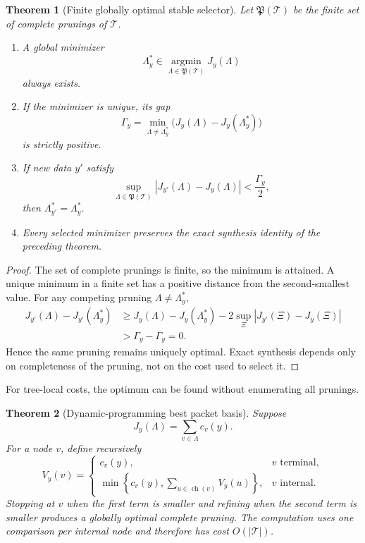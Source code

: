 \documentclass[11pt]{article}
\newtheorem{theorem}{Theorem}[section]
\theoremstyle{definition}
\theoremstyle{remark}
\begin{document}
\begin{theorem}[Finite globally optimal stable selector]
Let $\mathfrak P(\mathcal T)$ be the finite set of complete prunings of $\mathcal T$.

\begin{enumerate}[label=(\roman*)]
\item A global minimizer
\[
\Lambda_y^*\in\operatorname*{argmin}_{\Lambda\in\mathfrak P(\mathcal T)}J_y(\Lambda)
\]
always exists.
\item If the minimizer is unique, its gap
\[
\Gamma_y
=
\min_{\Lambda\ne\Lambda_y^*}
\bigl(J_y(\Lambda)-J_y(\Lambda_y^*)\bigr)
\]
is strictly positive.
\item If new data $y'$ satisfy
\[
\sup_{\Lambda\in\mathfrak P(\mathcal T)}
|J_{y'}(\Lambda)-J_y(\Lambda)|
<\frac{\Gamma_y}{2},
\]
then $\Lambda_{y'}^*=\Lambda_y^*$.
\item Every selected minimizer preserves the exact synthesis identity of the preceding theorem.
\end{enumerate}
\end{theorem}

\begin{proof}
The set of complete prunings is finite, so the minimum is attained.  A unique minimum in a finite set has a positive distance from the second-smallest value.  For any competing pruning $\Lambda\ne\Lambda_y^*$,
\[
\begin{aligned}
J_{y'}(\Lambda)-J_{y'}(\Lambda_y^*)
&\ge
J_y(\Lambda)-J_y(\Lambda_y^*)
-2\sup_{\Xi}|J_{y'}(\Xi)-J_y(\Xi)|\\
&>\Gamma_y-\Gamma_y=0.
\end{aligned}
\]
Hence the same pruning remains uniquely optimal.  Exact synthesis depends only on completeness of the pruning, not on the cost used to select it.
\end{proof}

For tree-local costs, the optimum can be found without enumerating all prunings.

\begin{theorem}[Dynamic-programming best packet basis]
Suppose
\[
J_y(\Lambda)=\sum_{v\in\Lambda}c_v(y).
\]
For a node $v$, define recursively
\[
V_y(v)
=
\begin{cases}
c_v(y),&v\text{ terminal},\\[2mm]
\displaystyle
\min\left\{c_v(y),\sum_{u\in\operatorname{ch}(v)}V_y(u)\right\},
&v\text{ internal}.
\end{cases}
\]
Stopping at $v$ when the first term is smaller and refining when the second term is smaller produces a globally optimal complete pruning.  The computation uses one comparison per internal node and therefore has cost $O(|\mathcal T|)$.
\end{theorem}
\end{document}
